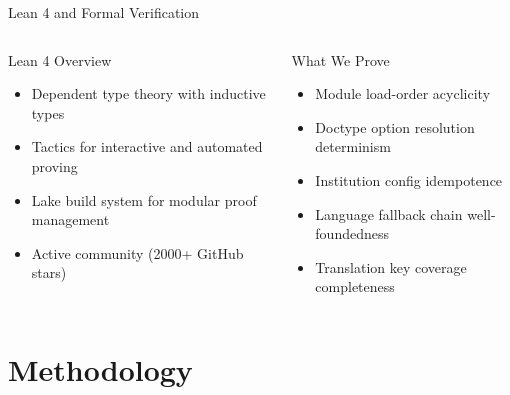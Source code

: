 \documentclass[
  doctype=beamer,
  beameraspectratio=169,
  beamertheme=Copenhagen,
  language=english,
]{omnilatex}
\begin{document}
\begin{frame}{Lean 4 and Formal Verification}
  \begin{columns}[T]
    \begin{block}{Lean 4 Overview}
      \begin{itemize}
        \item Dependent type theory with inductive types
        \item Tactics for interactive and automated proving
        \item Lake build system for modular proof management
        \item Active community (2000+ GitHub stars)
      \end{itemize}
    \end{block}

    \begin{exampleblock}{What We Prove}
      \begin{itemize}
        \item Module load-order acyclicity
        \item Doctype option resolution determinism
        \item Institution config idempotence
        \item Language fallback chain well-foundedness
        \item Translation key coverage completeness
      \end{itemize}
    \end{exampleblock}
  \end{columns}
\end{frame}

\section{Methodology}
\end{document}
